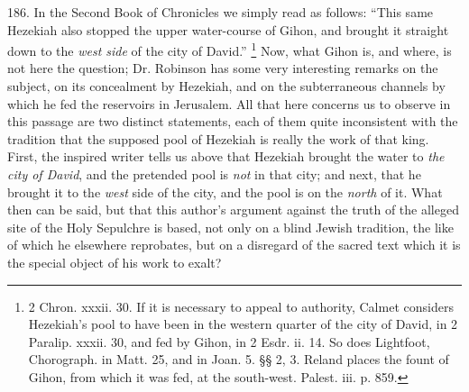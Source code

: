 186.
In the Second Book of Chronicles we simply read as follows: ``This
same Hezekiah also stopped the upper water-course of Gihon, and
brought it straight down to the \emph{west side} of the city of
David.'' \footnote{2 Chron. xxxii. 30. If it is necessary to appeal to authority, Calmet
considers Hezekiah's pool to have been in the western quarter of the
city of David, in 2 Paralip. xxxii. 30, and fed by Gihon, in 2 Esdr.
ii. 14. So does Lightfoot, Chorograph. in Matt. 25, and in Joan. 5.
§§ 2, 3. Reland places the fount of Gihon, from which it was fed, at
the south-west. Palest. iii. p. 859.} Now, what
Gihon is, and where, is not here the question; Dr. Robinson has some
very interesting remarks on the subject, on its concealment by
Hezekiah, and on the subterraneous channels by which he fed the
reservoirs in Jerusalem. All that here concerns us to observe in this
passage are two distinct statements, each of them quite inconsistent
with the tradition that the supposed pool of Hezekiah is really the
work of that king. First, the inspired writer tells us above that
Hezekiah brought the water to \emph{the city of David}, and the
pretended pool is \emph{not} in that city; and next, that he brought
it to the \emph{west} side of the city, and the pool is on the \emph{north}
of it. What then can be said, but that this author's argument against
the truth of the alleged site of the Holy Sepulchre is based, not only
on a blind Jewish tradition, the like of which he elsewhere
reprobates, but on a disregard of the sacred text which it is the
special object of his work to exalt?

